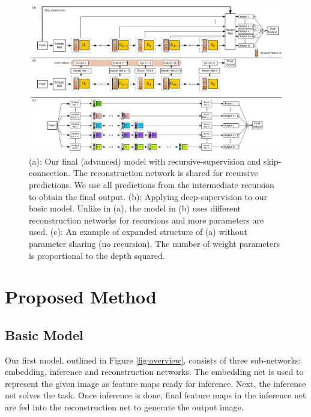 \documentclass[10pt,twocolumn,letterpaper]{article}
\begin{document}
\begin{figure}[t]
\begin{center}
	\includegraphics[width=\textwidth]{figs/f3}
	\caption{(a): Our final (advanced) model with recursive-supervision and skip-connection. The reconstruction network is shared for recursive predictions. We use all predictions from the intermediate recursion to obtain the final output. (b): Applying deep-supervision \cite{lee2014deeply} to our basic model. Unlike in (a), the model in (b) uses different reconstruction networks for recursions and more parameters are used.  (c): An example of expanded structure of (a) without parameter sharing (no recursion). The number of weight parameters is proportional to the depth squared. }
\label{fig:recursive_supervision}
\end{center}
\end{figure}

\section{Proposed Method}
\subsection{Basic Model}

Our first model, outlined in Figure \ref{fig:overview}, consists of three sub-networks: embedding, inference and reconstruction networks. The embedding net is used to represent the given image as feature maps ready for inference. Next, the inference net solves the task. Once inference is done, final feature maps in the inference net are fed into the reconstruction net to generate the output image.
\end{document}
